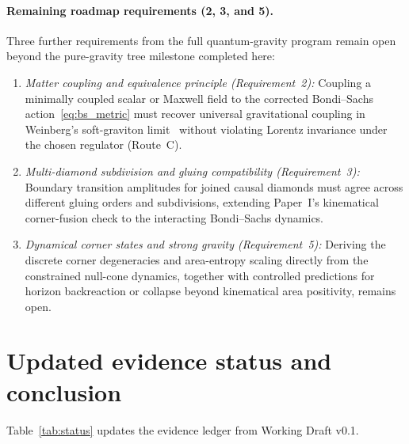 \documentclass[11pt]{article}
\begin{document}
\paragraph{Remaining roadmap requirements (2, 3, and 5).} Three further requirements from the full quantum-gravity program remain open beyond the pure-gravity tree milestone completed here:
\begin{enumerate}
\item \emph{Matter coupling and equivalence principle (Requirement~2):} Coupling a minimally coupled scalar or Maxwell field to the corrected Bondi--Sachs action~\eqref{eq:bs_metric} must recover universal gravitational coupling in Weinberg's soft-graviton limit~\cite{Weinberg1964} without violating Lorentz invariance under the chosen regulator (Route~C).
\item \emph{Multi-diamond subdivision and gluing compatibility (Requirement~3):} Boundary transition amplitudes for joined causal diamonds must agree across different gluing orders and subdivisions, extending Paper~I's kinematical corner-fusion check to the interacting Bondi--Sachs dynamics.
\item \emph{Dynamical corner states and strong gravity (Requirement~5):} Deriving the discrete corner degeneracies and area-entropy scaling directly from the constrained null-cone dynamics, together with controlled predictions for horizon backreaction or collapse beyond kinematical area positivity, remains open.
\end{enumerate}

\section{Updated evidence status and conclusion}\label{sec:status}

Table~\ref{tab:status} updates the evidence ledger from Working Draft v0.1.
\end{document}
